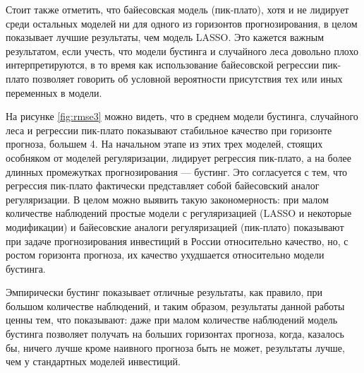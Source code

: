 Стоит также отметить, что байесовская модель (пик-плато), хотя и не лидирует среди остальных моделей ни для одного из горизонтов прогнозирования, в целом показывает лучшие результаты, чем модель LASSO. Это кажется важным результатом, если учесть, что модели бустинга и случайного леса довольно плохо интерпретируются, в то время как использование байесовской регрессии пик-плато позволяет говорить об условной вероятности присутствия тех или иных переменных в модели. 

На рисунке \ref{fig:rmse3} можно видеть, что в среднем модели бустинга, случайного леса и регрессии пик-плато показывают стабильное качество при горизонте прогноза, большем 4. На начальном этапе из этих трех моделей, стоящих особняком от моделей регуляризации, лидирует регрессия пик-плато, а на более длинных промежутках прогнозирования --- бустинг. Это согласуется с тем, что регрессия пик-плато фактически представляет собой байесовский аналог регуляризации. В целом можно выявить такую закономерность: при малом количестве наблюдений простые модели с регуляризацией (LASSO и некоторые модификации) и байесовские аналоги регуляризацией (пик-плато) показывают при задаче прогнозирования инвестиций в России относительно качество, но, с ростом горизонта прогноза, их качество ухудшается относительно модели бустинга. 

Эмпирически бустинг показывает отличные результаты, как правило, при большом количестве наблюдений, и таким образом, результаты данной работы ценны тем, что показывают: даже при малом количестве наблюдений модель бустинга позволяет получать на больших горизонтах прогноза, когда, казалось бы, ничего лучше кроме наивного прогноза быть не может, результаты лучше, чем у стандартных моделей инвестиций.


